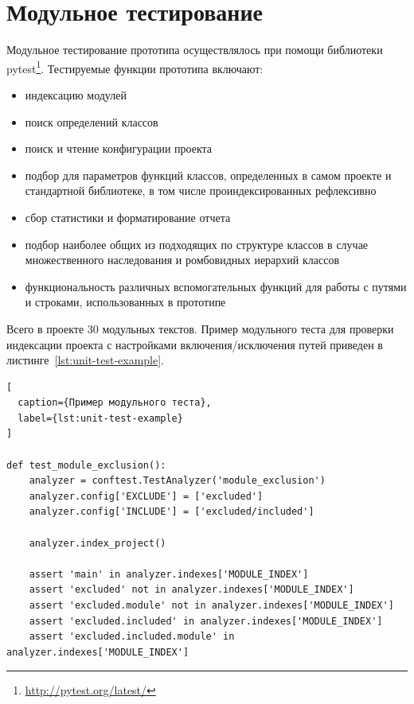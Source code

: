 \section{Модульное тестирование}
\label{sec:unit-testing}

Модульное тестирование прототипа осуществлялось при помощи библиотеки
pytest\footnote{\url{http://pytest.org/latest/}}. Тестируемые функции прототипа
включают:

\begin{itemize}
    \item индексацию модулей
    \item поиск определений классов
    \item поиск и чтение конфигурации проекта
    \item подбор для параметров функций классов, определенных в самом проекте и
      стандартной библиотеке, в том числе проиндексированных рефлексивно
    \item сбор статистики и форматирование отчета
    \item подбор наиболее общих из подходящих по структуре классов в случае
      множественного наследования и ромбовидных иерархий классов
    \item функциональность различных вспомогательных функций для работы с
      путями и строками, использованных в прототипе
\end{itemize}

Всего в проекте 30 модульных текстов. Пример модульного теста для проверки
индексации проекта с настройками включения/исключения путей приведен в
листинге~\ref{lst:unit-test-example}.

\begin{lstlisting}[
  caption={Пример модульного теста},
  label={lst:unit-test-example}
]

def test_module_exclusion():
    analyzer = conftest.TestAnalyzer('module_exclusion')
    analyzer.config['EXCLUDE'] = ['excluded']
    analyzer.config['INCLUDE'] = ['excluded/included']

    analyzer.index_project()

    assert 'main' in analyzer.indexes['MODULE_INDEX']
    assert 'excluded' not in analyzer.indexes['MODULE_INDEX']
    assert 'excluded.module' not in analyzer.indexes['MODULE_INDEX']
    assert 'excluded.included' in analyzer.indexes['MODULE_INDEX']
    assert 'excluded.included.module' in analyzer.indexes['MODULE_INDEX']

\end{lstlisting}
